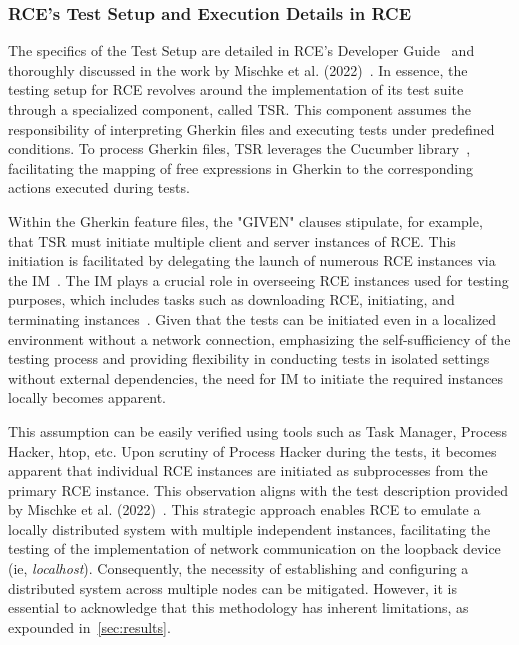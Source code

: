 \subsubsection{\ac{RCE}'s Test Setup and Execution Details in RCE}
The specifics of the Test Setup are detailed in \ac{RCE}'s Developer Guide~\cite{rceDevGuide10x} and thoroughly discussed in the work by Mischke et al. (2022)~\cite{10.1007/978-3-031-08760-8_44}. In essence, the testing setup for \ac{RCE} revolves around the implementation of its test suite through a specialized component, called \acf{TSR}. This component assumes the responsibility of interpreting Gherkin files and executing tests under predefined conditions. To process Gherkin files, \ac{TSR} leverages the Cucumber library~\cite{10.1007/978-3-031-08760-8_44}, facilitating the mapping of free expressions in Gherkin to the corresponding actions executed during tests.

Within the Gherkin feature files, the "GIVEN" clauses stipulate, for example, that \ac{TSR} must initiate multiple client and server instances of \ac{RCE}. This initiation is facilitated by delegating the launch of numerous \ac{RCE} instances via the \acf{IM}~\cite{rceDevGuide10x}. 
The \ac{IM} plays a crucial role in overseeing \ac{RCE} instances used for testing purposes, which includes tasks such as downloading \ac{RCE}, initiating, and terminating instances~\cite{10.1007/978-3-031-08760-8_44,rceDevGuide10x}. Given that the tests can be initiated even in a localized environment without a network connection, emphasizing the self-sufficiency of the testing process and providing flexibility in conducting tests in isolated settings without external dependencies, the need for \ac{IM} to initiate the required instances locally becomes apparent.

This assumption can be easily verified using tools such as Task Manager, Process Hacker, htop, etc. Upon scrutiny of Process Hacker during the tests, it becomes apparent that individual \ac{RCE} instances are initiated as subprocesses from the primary \ac{RCE} instance. This observation aligns with the test description provided by Mischke et al. (2022)~\cite{10.1007/978-3-031-08760-8_44}. This strategic approach enables \ac{RCE} to emulate a locally distributed system with multiple independent instances, facilitating the testing of the implementation of network communication on the loopback device (ie, \textit{ localhost}). Consequently, the necessity of establishing and configuring a distributed system across multiple nodes can be mitigated. However, it is essential to acknowledge that this methodology has inherent limitations, as expounded in~\cref{sec:results}.

